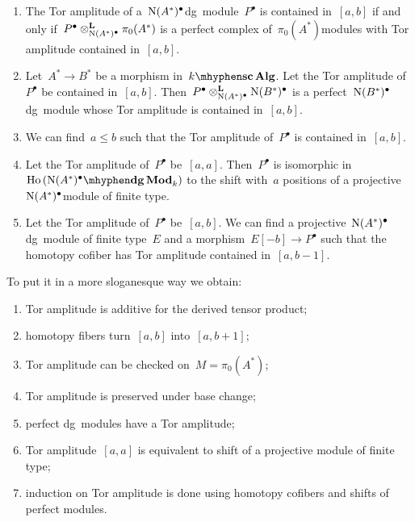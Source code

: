 \begin{refsection}
\begin{proposition}
\begin{enumerate}
    \item\label{enumerate:Tor-amplitude-3} The Tor amplitude of a~$\operatorname{N}(A^*)^\bullet$\dash dg~module~$P^\bullet$ is contained in~$[a,b]$ if and only if~$P^\bullet\otimes_{\operatorname{N}(A^*)^\bullet}^{\mathbf{L}}\pi_0(A^*)$ is a perfect complex of~$\pi_0(A^*)$\dash modules with Tor amplitude contained in~$[a,b]$.
    \item\label{enumerate:Tor-amplitude-4} Let~$A^*\to B^*$ be a morphism in~$\scAlg{k}$. Let the Tor amplitude of~$P^\bullet$ be contained in~$[a,b]$. Then~$P^\bullet\otimes_{\operatorname{N}(A^*)^\bullet}^{\mathbf{L}}\operatorname{N}(B^*)^\bullet$ is a perfect~$\operatorname{N}(B^*)^\bullet$\dash dg~module whose Tor amplitude is contained in~$[a,b]$.
    \item\label{enumerate:Tor-amplitude-5} We can find~$a\leq b$ such that the Tor amplitude of~$P^\bullet$ is contained in~$[a,b]$.
    \item\label{enumerate:Tor-amplitude-6} Let the Tor amplitude of~$P^\bullet$ be~$[a,a]$. Then~$P^\bullet$ is isomorphic in~$\Ho(\dgMod{\nerve(A^*)^\bullet}_k)$ to the shift with~$a$ positions of a projective~$\operatorname{N}(A^*)^\bullet$\dash module of finite type.
    \item\label{enumerate:Tor-amplitude-7} Let the Tor amplitude of~$P^\bullet$ be~$[a,b]$. We can find a projective~$\operatorname{N}(A^*)^\bullet$\dash dg~module of finite type~$E$ and a morphism~$E[-b]\to P^\bullet$ such that the homotopy cofiber has Tor amplitude contained in~$[a,b-1]$.
  \end{enumerate}
\end{proposition}

\begin{remark}
  To put it in a more sloganesque way we obtain:
  \begin{enumerate}
    \item Tor amplitude is additive for the derived tensor product;
    \item homotopy fibers turn~$[a,b]$ into~$[a,b+1]$;
    \item Tor amplitude can be checked on~$M=\pi_0(A^*)$;
    \item Tor amplitude is preserved under base change;
    \item perfect dg~modules have a Tor amplitude;
    \item Tor amplitude~$[a,a]$ is equivalent to shift of a projective module of finite type;
    \item induction on Tor amplitude is done using homotopy cofibers and shifts of perfect modules.
  \end{enumerate}
\end{remark}


\end{refsection}
